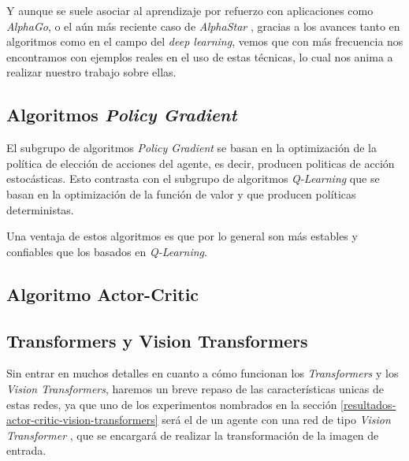 Y aunque se suele asociar al aprendizaje por refuerzo con aplicaciones como \textit{AlphaGo}, o el aún más reciente caso de \textit{AlphaStar} \citep{alphastar}, gracias a los avances tanto en algoritmos como en el campo del \textit{deep learning}, vemos que con más frecuencia nos encontramos con ejemplos reales en el uso de estas técnicas, lo cual nos anima a realizar nuestro trabajo sobre ellas.
\medskip

\subsection{Algoritmos \textit{Policy Gradient}}
\label{algoritmo-policy-gradient}

El subgrupo de algoritmos \textit{Policy Gradient} \citep{sutton1999policy} se basan en la optimización de la política de elección de acciones del agente, es decir, producen politicas de acción estocásticas. Esto contrasta con el subgrupo de algoritmos \textit{Q-Learning} \citep{mnih2013playing} que se basan en la optimización de la función de valor y que producen políticas deterministas.
\medskip

Una ventaja de estos algoritmos es que por lo general son más estables y confiables que los basados en \textit{Q-Learning}. 

\subsection{Algoritmo Actor-Critic}
\label{algoritmo-actor-critic}

\subsection{Transformers y Vision Transformers}
\label{vision-transformers}

Sin entrar en muchos detalles en cuanto a cómo funcionan los \textit{Transformers} y los \textit{Vision Transformers}, haremos un breve repaso de las características unicas de estas redes, ya que uno de los experimentos nombrados en la sección \ref{resultados-actor-critic-vision-transformers} será el de un agente con una red de tipo \textit{Vision Transformer} \citep{visiontransformers}, que se encargará de realizar la transformación de la imagen de entrada.
\medskip

